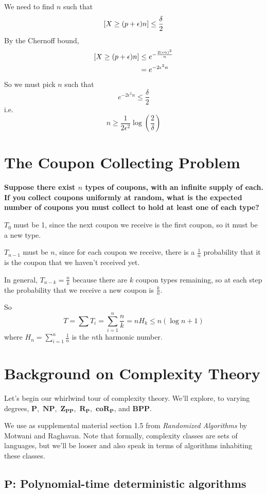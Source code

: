 \documentclass[11pt]{article}
\let\Pr\relax
\DeclareMathOperator*{\Pr}{\mathbb{P}}
\newcommand{\eps}{\epsilon}
\newcommand{\Pt}{\ensuremath{\mathbf{P}}}
\newcommand{\NP}{\ensuremath{\mathbf{NP}}}
\newcommand{\BPP}{\ensuremath{\mathbf{BPP}}}
\newcommand{\ZPP}{\ensuremath{\mathbf{Z_{PP}}}}
\newcommand{\RP}{\ensuremath{\mathbf{R_{P}}}}
\newcommand{\coRP}{\ensuremath{\mathbf{coR_{P}}}}
\let\ab\allowbreak
\begin{document}
We need to find $n$ such that
$$ \Pr[X \ge (p + \eps)n] \le \frac{\delta}{2} $$
By the Chernoff bound,
\begin{align*}
  \Pr[X \ge (p + \eps)n] &\le e^{-\frac{2(\eps n)^2}{n}} \\
                         &= e^{-2\eps^2 n}
\end{align*}
So we must pick $n$ such that
$$ e^{-2\eps^2 n} \le \frac \delta 2 $$
i.e.
$$ n \ge \frac{1}{2\eps^2}\log\left(\frac{2}{\delta} \right) $$

\section{The Coupon Collecting Problem}

\textbf{Suppose there exist $n$ types of coupons, with an infinite supply of each. If you collect coupons uniformly at random, what is the expected number of coupons you must collect to hold at least one of each type?}



$T_0$ must be 1, since the next coupon we receive is the first coupon, so it must be a new type.

$T_{n-1}$ must be $n$, since for each coupon we receive, there is a $\frac{1}{n}$ probability that it is the coupon that we haven't received yet.

In general, $T_{n-k} = \frac n k$ because there are $k$ coupon types remaining, so at each step the probability that we receive a new coupon is $\frac{k}{n}$.

So
$$ T = \sum{T_i} = \sum_{i=1}^n \frac{n}{k} = nH_k \leq n(\log n + 1) $$
where $H_n = \sum_{i=1}^n \frac{1}{n}$ is the $n$th harmonic number.

\section{Background on Complexity Theory}

Let's begin our whirlwind tour of complexity theory. We'll explore, to varying degrees, \Pt,\ \NP,\ab\ \ZPP,\ \RP,\ \coRP, and \BPP.

We use as supplemental material section 1.5 from \textit{Randomized Algorithms} by Motwani and Raghavan.
Note that formally, complexity classes are sets of languages, but we'll be looser and also speak in terms of algorithms inhabiting these classes.

\subsection{\Pt: Polynomial-time deterministic algorithms}
\end{document}
